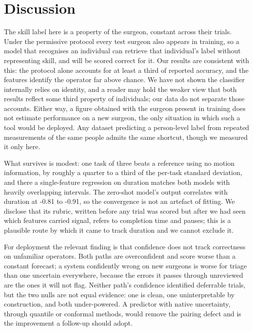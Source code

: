 \section{Discussion}

The skill label here is a property of the surgeon, constant across their trials. Under the permissive protocol every test surgeon also appears in training, so a model that recognises an individual can retrieve that individual's label without representing skill, and will be scored correct for it. Our results are consistent with this: the protocol alone accounts for at least a third of reported accuracy, and the features identify the operator far above chance. We have not shown the classifier internally relies on identity, and a reader may hold the weaker view that both results reflect some third property of individuals; our data do not separate those accounts. Either way, a figure obtained with the surgeon present in training does not estimate performance on a new surgeon, the only situation in which such a tool would be deployed. Any dataset predicting a person-level label from repeated measurements of the same people admits the same shortcut, though we measured it only here.

What survives is modest: one task of three beats a reference using no motion information, by roughly a quarter to a third of the per-task standard deviation, and there a single-feature regression on duration matches both models with heavily overlapping intervals. The zero-shot model's output correlates with duration at -0.81 to -0.91, so the convergence is not an artefact of fitting. We disclose that its rubric, written before any trial was scored but after we had seen which features carried signal, refers to completion time and pauses; this is a plausible route by which it came to track duration and we cannot exclude it.

For deployment the relevant finding is that confidence does not track correctness on unfamiliar operators. Both paths are overconfident and score worse than a constant forecast; a system confidently wrong on new surgeons is worse for triage than one uncertain everywhere, because the errors it passes through unreviewed are the ones it will not flag. Neither path's confidence identified deferrable trials, but the two nulls are not equal evidence: one is clean, one uninterpretable by construction, and both under-powered. A predictor with native uncertainty, through quantile or conformal methods, would remove the pairing defect and is the improvement a follow-up should adopt.

